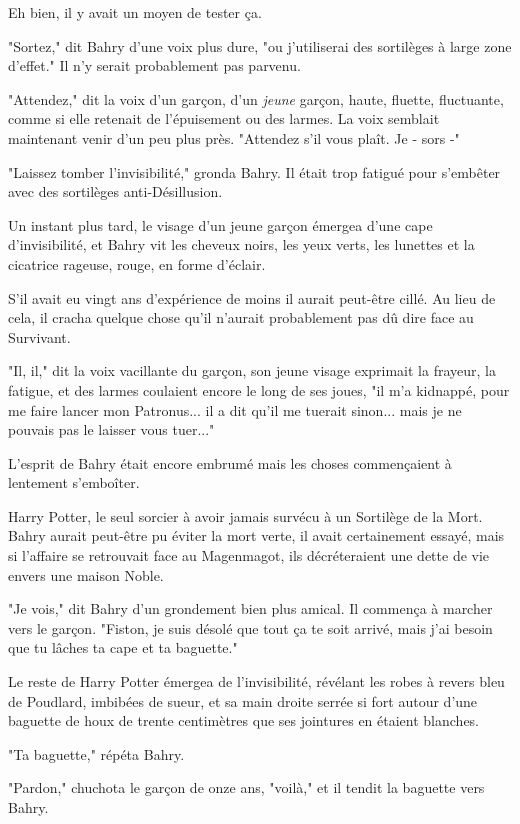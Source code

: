 Eh bien, il y avait un moyen de tester ça.

"Sortez," dit Bahry d'une voix plus dure, "ou j'utiliserai des sortilèges à large zone d'effet." Il n'y serait probablement pas parvenu.

"Attendez," dit la voix d'un garçon, d'un \emph{jeune}  garçon, haute, fluette, fluctuante, comme si elle retenait de l'épuisement ou des larmes. La voix semblait maintenant venir d'un peu plus près. "Attendez s'il vous plaît. Je - sors -"

"Laissez tomber l'invisibilité," gronda Bahry. Il était trop fatigué pour s'embêter avec des sortilèges anti-Désillusion.

Un instant plus tard, le visage d'un jeune garçon émergea d'une cape d'invisibilité, et Bahry vit les cheveux noirs, les yeux verts, les lunettes et la cicatrice rageuse, rouge, en forme d'éclair.

S'il avait eu vingt ans d'expérience de moins il aurait peut-être cillé. Au lieu de cela, il cracha quelque chose qu'il n'aurait probablement pas dû dire face au Survivant.

"Il, il," dit la voix vacillante du garçon, son jeune visage exprimait la frayeur, la fatigue, et des larmes coulaient encore le long de ses joues, "il m'a kidnappé, pour me faire lancer mon Patronus... il a dit qu'il me tuerait sinon... mais je ne pouvais pas le laisser vous tuer..."

L'esprit de Bahry était encore embrumé mais les choses commençaient à lentement s'emboîter.

Harry Potter, le seul sorcier à avoir jamais survécu à un Sortilège de la Mort. Bahry aurait peut-être pu éviter la mort verte, il avait certainement essayé, mais si l'affaire se retrouvait face au Magenmagot, ils décréteraient une dette de vie envers une maison Noble.

"Je vois," dit Bahry d'un grondement bien plus amical. Il commença à marcher vers le garçon. "Fiston, je suis désolé que tout ça te soit arrivé, mais j'ai besoin que tu lâches ta cape et ta baguette."

Le reste de Harry Potter émergea de l'invisibilité, révélant les robes à revers bleu de Poudlard, imbibées de sueur, et sa main droite serrée si fort autour d'une baguette de houx de trente centimètres que ses jointures en étaient blanches.

"Ta baguette," répéta Bahry.

"Pardon," chuchota le garçon de onze ans, "voilà," et il tendit la baguette vers Bahry.

